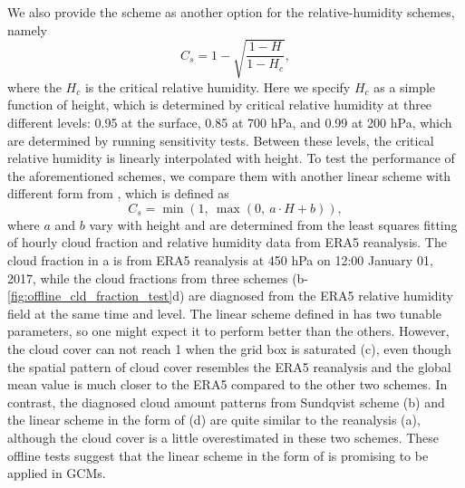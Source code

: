 We also provide the \citet{Sundqvist1989} scheme as another option for the relative-humidity schemes, namely
\begin{equation}
	C_s = 1-\sqrt{\frac{1-H}{1-H_{c}}},
	\label{eq:sundqvist}
\end{equation}
where the $H_{c}$ is the critical relative humidity. Here we specify $H_{c}$ as a simple function of height, which is determined by critical relative humidity at three different levels: 0.95 at the surface, 0.85 at 700 hPa, and 0.99 at 200 hPa, which are determined
by running sensitivity tests. Between these levels, the critical relative humidity is linearly interpolated with height. To test the performance of the aforementioned schemes, we compare them with another linear scheme with different form from , which is defined as
\begin{equation}
	C_s = \min\left(1, ~\max \left(0, ~ a \cdot H + b \right)\right),
	\label{eq:linear2}
\end{equation}
where $a$ and $b$ vary with height and are determined from the least squares fitting of hourly cloud fraction and relative humidity data from ERA5 reanalysis. The cloud fraction in a is from ERA5 reanalysis at 450 hPa on 12:00 January 01, 2017, while the cloud fractions from three schemes (b-\ref{fig:offline_cld_fraction_test}d) are diagnosed from the ERA5 relative humidity field at the same time and level. The linear scheme defined in  has two tunable parameters, so one might expect it to perform better than the others. However, the cloud cover can not reach 1 when the grid box is saturated (c), even though the spatial pattern of cloud cover resembles the ERA5 reanalysis and the global mean value is much closer to the ERA5 compared to the other two schemes. In contrast, the diagnosed cloud amount patterns from Sundqvist scheme (b) and the linear scheme in the form of  (d) are quite similar to the reanalysis (a), although the cloud cover is a little overestimated in these two schemes. These offline tests suggest that the linear scheme in the form of  is promising to be applied in GCMs.

